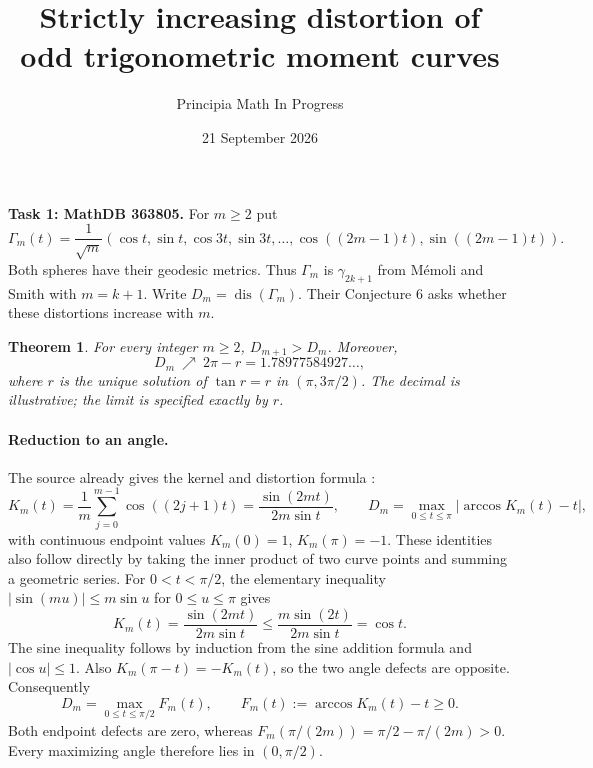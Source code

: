 \documentclass[11pt]{article}
\title{Strictly increasing distortion of odd trigonometric moment curves}
\author{Principia Math In Progress}
\date{21 September 2026}
\newtheorem{theorem}{Theorem}
\newcommand{\dis}{\operatorname{dis}}
\begin{document}
\maketitle
\noindent\textbf{Task 1: MathDB 363805.}
For $m\geq2$ put
\[
 \Gamma_m(t)=\frac1{\sqrt m}
 (\cos t,\sin t,\cos3t,\sin3t,\ldots,
                  \cos((2m-1)t),\sin((2m-1)t)).
\]
Both spheres have their geodesic metrics. Thus $\Gamma_m$
is $\gamma_{2k+1}$ from M\'emoli and Smith \cite{MS} with
$m=k+1$. Write $D_m=\dis(\Gamma_m)$. Their Conjecture 6 asks
whether these distortions increase with $m$.

\begin{theorem}\label{main}
For every integer $m\geq2$, $D_{m+1}>D_m$. Moreover,
\[
 D_m\ \nearrow\ 2\pi-r=1.78977584927\ldots,
\]
where $r$ is the unique solution of $\tan r=r$ in $(\pi,3\pi/2)$.
The decimal is illustrative; the limit is specified exactly by $r$.
\end{theorem}

\paragraph{Reduction to an angle.}
The source already gives the kernel and distortion formula
\cite[Proposition 5.5 and Remark 5.8]{MS}:
\begin{equation}\label{kernel}
 K_m(t)=\frac1m\sum_{j=0}^{m-1}\cos((2j+1)t)
       =\frac{\sin(2mt)}{2m\sin t},\qquad
 D_m=\max_{0\leq t\leq\pi}|\arccos K_m(t)-t|,
\end{equation}
with continuous endpoint values $K_m(0)=1$, $K_m(\pi)=-1$.
These identities also follow directly by taking the inner product
of two curve points and summing a geometric series.
For $0<t<\pi/2$, the elementary inequality
$|\sin(mu)|\leq m\sin u$ for $0\leq u\leq\pi$ gives
\[
 K_m(t)=\frac{\sin(2mt)}{2m\sin t}
       \leq\frac{m\sin(2t)}{2m\sin t}=\cos t.
\]
The sine inequality follows by induction from the sine addition
formula and $|\cos u|\leq1$.
Also $K_m(\pi-t)=-K_m(t)$, so the two angle defects are opposite.
Consequently
\begin{equation}\label{defect}
 D_m=\max_{0\leq t\leq\pi/2}F_m(t),\qquad
 F_m(t):=\arccos K_m(t)-t\geq0.
\end{equation}
Both endpoint defects are zero, whereas
$F_m(\pi/(2m))=\pi/2-\pi/(2m)>0$. Every maximizing angle
therefore lies in $(0,\pi/2)$.
\end{document}
